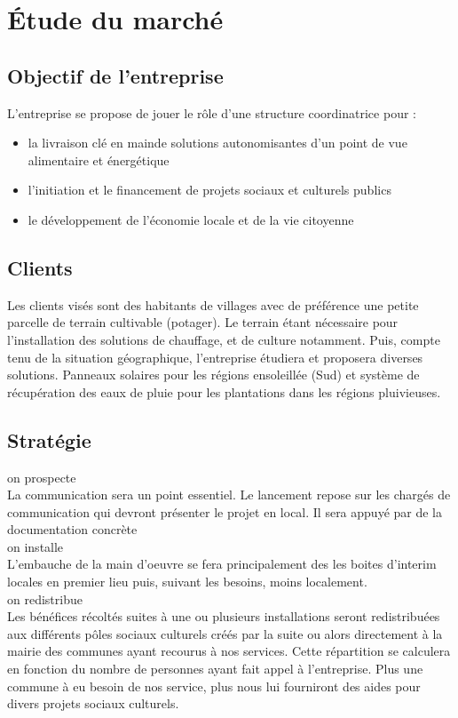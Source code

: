 \documentclass[11pt]{article}
\begin{document}

\section{Étude du marché}
\label{sec:marche}

\subsection{Objectif de l'entreprise}
\label{sec:objectifs}

L'entreprise se propose de jouer le rôle d'une structure coordinatrice pour :
\begin{itemize}
	\item la livraison \og{}clé en main\fg{~}de solutions autonomisantes d'un point de vue alimentaire et énergétique
	\item l'initiation et le financement de projets sociaux et culturels publics
	\item le développement de l'économie locale et de la vie citoyenne
\end{itemize}



\subsection{Clients}
\label{sub:client}
Les clients visés sont des habitants de villages avec de préférence une petite parcelle de terrain cultivable (potager).
Le terrain étant nécessaire pour l'installation des solutions de chauffage, et de culture notamment.
Puis, compte tenu de la situation géographique, l'entreprise étudiera et proposera diverses solutions. Panneaux solaires pour les régions ensoleillée (Sud) et système de récupération des eaux de pluie pour les plantations dans les régions pluivieuses.

\subsection{Stratégie}
\label{sub:strategie}
on prospecte\\
La communication sera un point essentiel. Le lancement repose sur les chargés de communication qui devront présenter le projet en local. Il sera appuyé par de la documentation concrète \\
on installe\\
L'embauche de la main d'oeuvre se fera principalement des les boites d'interim locales en premier lieu puis, suivant les besoins, moins localement. \\
on redistribue\\
Les bénéfices récoltés suites à une ou plusieurs installations seront redistribuées aux différents pôles sociaux culturels créés par la suite ou alors directement à la mairie des communes ayant recourus à nos services. Cette répartition se calculera en fonction du nombre de personnes ayant fait appel à l'entreprise. Plus une commune à eu besoin de nos service, plus nous lui fourniront des aides pour divers projets sociaux culturels.
\end{document}
